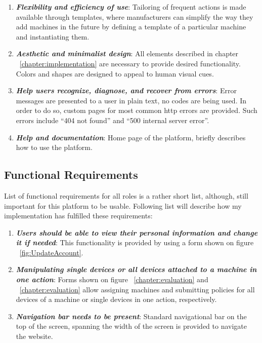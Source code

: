 \begin{enumerate}
	\item \textbf{\textit{Flexibility and efficiency of use}}: Tailoring of frequent actions is made available through templates, where manufacturers can simplify the way they add machines in the future by defining a template of a particular machine and instantiating them.

	\item \textbf{\textit{Aesthetic and minimalist design}}: All elements described in chapter ~\ref{chapter:implementation} are necessary to provide desired functionality. Colors and shapes are designed to appeal to human visual cues.

	\item \textbf{\textit{Help users recognize, diagnose, and recover from errors}}: Error messages are presented to a user in plain text, no codes are being used. In order to do so, custom pages for most common http errors are provided. Such errors include ``404 not found'' and ``500 internal server error''.

	\item \textbf{\textit{Help and documentation}}: Home page of the platform, briefly describes how to use the platform.
\end{enumerate}

\subsection{Functional Requirements}

List of functional requirements for all roles is a rather short list, although, still important for this platform to be usable. Following list will describe how my implementation has fulfilled these requirements:

\begin{enumerate}
	\setlength{\itemsep}{1pt}
	\item \textbf{\textit{Users should be able to view their personal information and change it if needed}}: This functionality is provided by using a form shown on figure ~\ref{fig:UpdateAccount}.
	\item \textbf{\textit{Manipulating single devices or all devices attached to a machine in one action}}: Forms shown on figure ~\ref{chapter:evaluation} and ~\ref{chapter:evaluation} allow assigning machines and submitting policies for all devices of a machine or single devices in one action, respectively.
	\item \textbf{\textit{Navigation bar needs to be present}}: Standard navigational bar on the top of the screen, spanning the width of the screen is provided to navigate the website.
\end{enumerate} 

